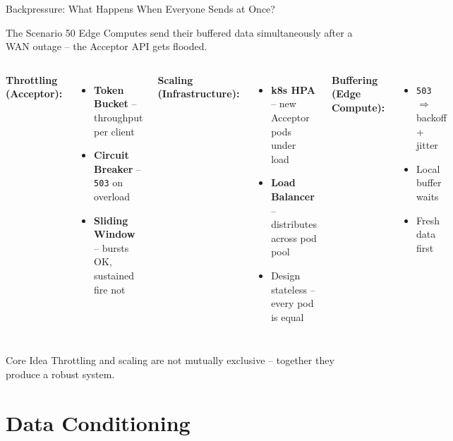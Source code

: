 \documentclass[aspectratio=169]{beamer}
\begin{document}
\begin{frame}{Backpressure: What Happens When Everyone Sends at Once?}
  \begin{alertblock}{The Scenario}
    50 Edge Computes send their buffered data simultaneously after a WAN outage –
    the Acceptor API gets flooded.
  \end{alertblock}
  \vspace{0.5em}
  \begin{columns}
      \textbf{Throttling (Acceptor):}
      \begin{itemize}
        \item \textbf{Token Bucket} – throughput per client
        \item \textbf{Circuit Breaker} – \texttt{503} on overload
        \item \textbf{Sliding Window} – bursts OK, sustained fire not
      \end{itemize}
      \textbf{Scaling (Infrastructure):}
      \begin{itemize}
        \item \textbf{k8s HPA} – new Acceptor pods under load
        \item \textbf{Load Balancer} – distributes across pod pool
        \item Design stateless – every pod is equal
      \end{itemize}
      \textbf{Buffering (Edge Compute):}
      \begin{itemize}
        \item \texttt{503} $\Rightarrow$ backoff + jitter
        \item Local buffer waits
        \item Fresh data first
      \end{itemize}
  \end{columns}
  \vspace{0.5em}
  \begin{exampleblock}{Core Idea}
    Throttling and scaling are not mutually exclusive –
    together they produce a robust system.
  \end{exampleblock}
\end{frame}

\section{Data Conditioning}
\end{document}
